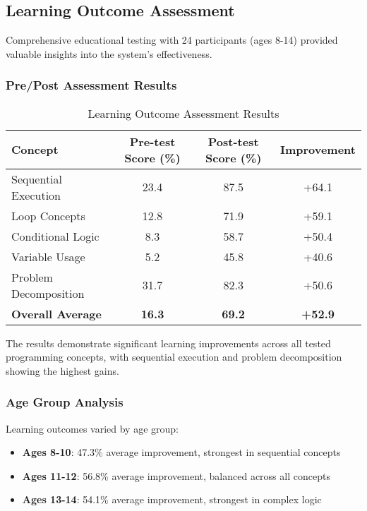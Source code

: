 \subsection{Learning Outcome Assessment}

Comprehensive educational testing with 24 participants (ages 8-14) provided valuable insights into the system's effectiveness.

\subsubsection{Pre/Post Assessment Results}

\begin{table}[H]
\centering
\caption{Learning Outcome Assessment Results}
\begin{tabular}{|l|c|c|c|}
\hline
\textbf{Concept} & \textbf{Pre-test Score (\%)} & \textbf{Post-test Score (\%)} & \textbf{Improvement} \\
\hline
Sequential Execution & 23.4 & 87.5 & +64.1 \\
Loop Concepts & 12.8 & 71.9 & +59.1 \\
Conditional Logic & 8.3 & 58.7 & +50.4 \\
Variable Usage & 5.2 & 45.8 & +40.6 \\
Problem Decomposition & 31.7 & 82.3 & +50.6 \\
\hline
\textbf{Overall Average} & \textbf{16.3} & \textbf{69.2} & \textbf{+52.9} \\
\hline
\end{tabular}
\label{tab:learning_outcomes}
\end{table}

The results demonstrate significant learning improvements across all tested programming concepts, with sequential execution and problem decomposition showing the highest gains.

\subsubsection{Age Group Analysis}

Learning outcomes varied by age group:

\begin{itemize}
    \item \textbf{Ages 8-10}: 47.3\% average improvement, strongest in sequential concepts
    \item \textbf{Ages 11-12}: 56.8\% average improvement, balanced across all concepts
    \item \textbf{Ages 13-14}: 54.1\% average improvement, strongest in complex logic
\end{itemize}

